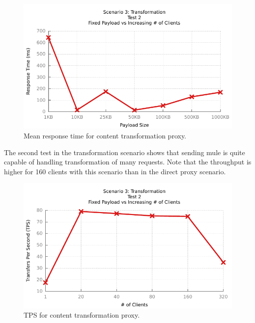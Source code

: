 \begin{figure}[H]
	\label{fig:transform-1-2}
	\caption{Mean response time for content transformation proxy.}
	\centerline{\includegraphics{img/transform_fu_ip_resp}}
\end{figure}

The second test in the transformation scenario shows that sending mule is quite capable of handling transformation of many requests. Note that the throughput is higher for 160 clients with this scenario than in the direct proxy scenario.

\begin{figure}[H]
	\caption{TPS for content transformation proxy.}
	\centerline{\includegraphics{img/transform_fp_iu_tps}}
	\label{fig:transform-2-1}
\end{figure}

